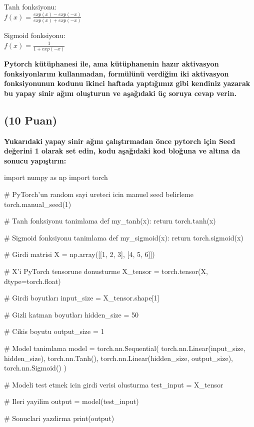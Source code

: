 \documentclass[11pt]{article}
\begin{document}
Tanh fonksiyonu:\\
$f(x) = \frac{exp(x) - exp(-x)}{exp(x) + exp(-x)}$
\vspace{.2in}

Sigmoid fonksiyonu:\\
$f(x) = \frac{1}{1 + exp(-x)}$

\vspace{.2in}
 \textbf{Pytorch kütüphanesi ile, ama kütüphanenin hazır aktivasyon fonksiyonlarını kullanmadan, formülünü verdiğim iki aktivasyon fonksiyonunun kodunu ikinci haftada yaptığımız gibi kendiniz yazarak bu yapay sinir ağını oluşturun ve aşağıdaki üç soruya cevap verin.}
 
\subsection{(10 Puan)} \textbf{Yukarıdaki yapay sinir ağını çalıştırmadan önce pytorch için Seed değerini 1 olarak set edin, kodu aşağıdaki kod bloğuna ve altına da sonucu yapıştırın:}

\begin{python}
import numpy as np
import torch

# PyTorch'un random sayi ureteci icin manuel seed belirleme
torch.manual_seed(1)

# Tanh fonksiyonu tanimlama
def my_tanh(x):
    return torch.tanh(x)

# Sigmoid fonksiyonu tanimlama
def my_sigmoid(x):
    return torch.sigmoid(x)

# Girdi matrisi
X = np.array([[1, 2, 3],
              [4, 5, 6]])

# X'i PyTorch tensorune donusturme
X_tensor = torch.tensor(X, dtype=torch.float)

# Girdi boyutları
input_size = X_tensor.shape[1]

# Gizli katman boyutları
hidden_size = 50

# Cikis boyutu
output_size = 1

# Model tanimlama
model = torch.nn.Sequential(
    torch.nn.Linear(input_size, hidden_size),
    torch.nn.Tanh(),
    torch.nn.Linear(hidden_size, output_size),
    torch.nn.Sigmoid()
)

# Modeli test etmek icin girdi verisi olusturma
test_input = X_tensor

# Ileri yayilim
output = model(test_input)

# Sonuclari yazdirma
print(output)

\end{python}
\end{document}
